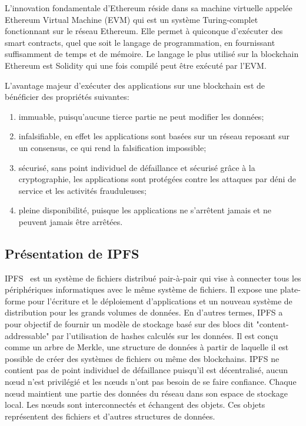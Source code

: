 \documentclass{tnreport}
\begin{document}
L'innovation fondamentale d'Ethereum réside dans sa machine virtuelle appelée Ethereum Virtual Machine (EVM) qui est un système Turing-complet fonctionnant sur le réseau Ethereum. Elle permet à quiconque d'exécuter des smart contracts, quel que soit le langage de programmation, en fournissant suffisamment de temps et de mémoire. Le langage le plus utilisé sur la blockchain Ethereum est Solidity qui une fois compilé peut être exécuté par l'EVM.

L'avantage majeur d'exécuter des applications sur une blockchain est de bénéficier des propriétés suivantes:
\begin{enumerate}
	\item immuable, puisqu'aucune tierce partie ne peut modifier les données;
	\item infalsifiable, en effet les applications sont basées sur un réseau reposant sur un consensus, ce qui rend la falsification impossible;
	\item sécurisé, sans point individuel de défaillance et sécurisé grâce à la cryptographie, les applications sont protégées contre les attaques par déni de service et les activités frauduleuses;
	\item pleine disponibilité, puisque les applications ne s'arrêtent jamais et ne peuvent jamais être arrêtées.
\end{enumerate}

\subsection{Présentation de IPFS}

IPFS~\cite{ipfs-paper} est un système de fichiers distribué pair-à-pair qui vise à connecter tous les périphériques informatiques avec le même système de fichiers. Il expose une plate-forme pour l'écriture et le déploiement d'applications et un nouveau système de distribution pour les grands volumes de données. 
En d'autres termes, IPFS a pour objectif de fournir un modèle de stockage basé sur des blocs dit "content-addressable" par l'utilisation de hashes calculés sur les données. Il est conçu comme un arbre de Merkle, une structure de données à partir de laquelle il est possible de créer des systèmes de fichiers ou même des blockchains. IPFS ne contient pas de point individuel de défaillance puisqu'il est décentralisé, aucun nœud n'est privilégié et les nœuds n'ont pas besoin de se faire confiance. 
Chaque nœud maintient une partie des données du réseau dans son espace de stockage local. 
Les nœuds sont interconnectés et échangent des objets. Ces objets représentent des fichiers et d'autres structures de données.
\end{document}
